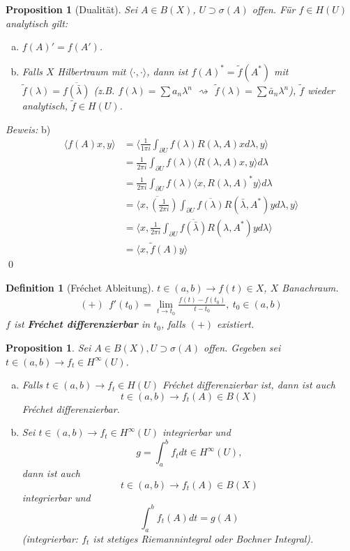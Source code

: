 \documentclass[12pt]{extreport} %
\newtheorem{Definition}[Satz]{Definition}
\newtheorem{Prop}[Satz]{Proposition}
\numberwithin{equation}{section}
\newcommand{\m}{\cdot}
\newcommand{\Bew}{\emph{Beweis: }}
\begin{document}
	
	\begin{Prop}[Dualität]
		Sei $A\in B(X)$, $U\supset \sigma(A)$ offen. Für $f\in H(U)$ analytisch gilt:
		\begin{enumerate}[a)]
			\item $f(A)' = f(A')$.
			\item Falls $X$ Hilbertraum mit $\langle \m,\m\rangle$, dann ist $f(A)^* = \tilde f(A^*)$ mit $\tilde f(\lambda) = \overline{f(\bar \lambda)}$ (z.B. $f(\lambda) = \sum a_n\lambda^n$ $\rightsquigarrow$ $\tilde f(\lambda) = \sum \bar a_n \lambda^n$), $\tilde f$ wieder analytisch, $\tilde f\in H(U)$.
		\end{enumerate}
	\end{Prop}
	
	\Bew b) 
	\begin{align*}
		\langle f(A)x, y\rangle &= \langle \frac{1}{1\pi i}\int_{\partial U} f(\lambda) R(\lambda, A) x d\lambda, y\rangle \\
		&= \frac{1}{2\pi i} \int_{\partial U} f(\lambda) \langle R(\lambda, A)x, y\rangle d\lambda\\
		&= \frac{1}{2\pi i}\int_{\partial U} f(\lambda)\langle x, R(\lambda,A)^*y\rangle d\lambda\\
		&= \overline{\langle x, \left(\frac{1}{2\pi i} \right)} \int_{\partial U} \overline{f(\lambda)} R(\bar \lambda, A^*) yd\lambda, y\rangle\\
		&= \langle x, \frac{1}{2\pi i} \int_{\partial U} \overline{f(\bar{\lambda})} R(\lambda, A^*) yd\lambda\rangle \\
		&= \langle x, \tilde f(A)y\rangle 
	\end{align*}
	\qed
	
	\begin{Definition}[Fréchet Ableitung]
		$t\in (a,b)\rightarrow f(t)\in X$, $X$ Banachraum. 
		\begin{align*}
			(+)~~f'(t_0) = \lim\limits_{t\rightarrow t_0} \frac{f(t) - f(t_0)}{t-t_0},~ t_0\in (a,b)
		\end{align*}
		$f$ ist \textbf{Fréchet differenzierbar} in $t_0$, falls $(+)$ existiert.
	\end{Definition}
	
	\begin{Prop}
		Sei $A\in B(X), U\supset \sigma(A)$ offen. Gegeben sei $t\in (a,b)\rightarrow f_t\in H^\infty(U)$.
		\begin{enumerate}[a)]
			\item Falls $t\in (a,b)\rightarrow f_t\in H(U)$ Fréchet differenzierbar ist, dann ist auch 
			$$t\in (a,b)\rightarrow f_t(A)\in B(X)$$
			Fréchet differenzierbar.
			\item Sei $t\in (a,b) \rightarrow f_t\in H^\infty(U)$ integrierbar und 
			$$g= \int_{a}^{b}f_t dt\in H^\infty(U),$$
			dann ist auch 
			$$t\in (a,b)\rightarrow f_t(A)\in B(X)$$
			integrierbar und 
			$$\int_{a}^{b} f_t(A) dt = g(A)$$
			(integrierbar: $f_t$ ist stetiges Riemannintegral oder Bochner Integral).
		\end{enumerate}
	\end{Prop}
	
\end{document}
